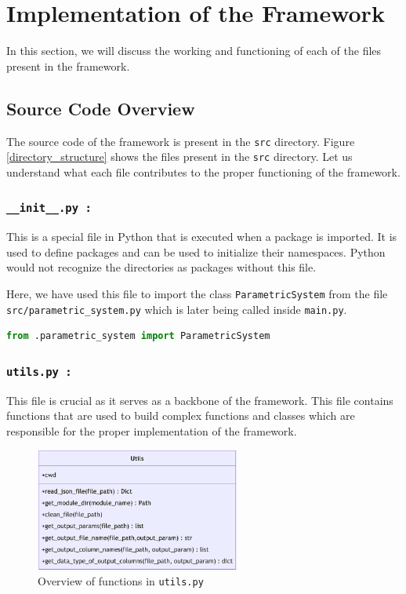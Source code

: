 \section{Implementation of the Framework}
In this section, we will discuss the working and functioning of each of the files present in the framework.
\subsection{Source Code Overview}
The source code of the framework is present in the \texttt{src} directory. Figure \ref{directory_structure} shows the files present in the \texttt{src} directory.
Let us understand what each file contributes to the proper functioning of the framework.

\subsubsection{\textbf{\texttt{\_\_init\_\_.py :}}}
This is a special file in Python that is executed when a package is imported. It is used to define packages and can be used to initialize
their namespaces. Python would not recognize the directories as packages without this file.

Here, we have used this file to import the class \texttt{ParametricSystem} from the file \texttt{src/parametric\_system.py} which is later being called
inside \texttt{main.py}.
  
\renewcommand{\lstlistingname}{Code}
\lstset{style=pythoncode}
\begin{lstlisting}[language=python, caption={\texttt{\_\_init\_\_.py}}, label={init_file}]
from .parametric_system import ParametricSystem
\end{lstlisting}

\subsubsection{\textbf{\texttt{utils.py :}}}
This file is crucial as it serves as a backbone of the framework. This file contains functions that are used to build complex functions and classes which are
responsible for the proper implementation of the framework. 
\begin{figure}[!h]
  \centering
  \includegraphics[width=0.6\textwidth]{Images/utils.pdf}
  \caption{Overview of functions in \texttt{utils.py}}
\end{figure}



